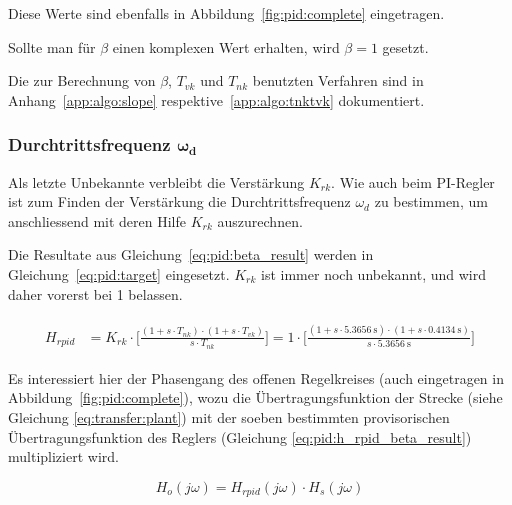 Diese Werte sind ebenfalls in Abbildung~\ref{fig:pid:complete} eingetragen.

Sollte  man  f\"ur  $\beta$  einen komplexen  Wert  erhalten,  wird  $\beta=1$
gesetzt.

Die zur Berechnung von $\beta$, $T_{vk}$ und $T_{nk}$ benutzten Verfahren sind
in Anhang~\ref{app:algo:slope} respektive~\ref{app:algo:tnktvk} dokumentiert.


\subsubsection{Durchtrittsfrequenz $\mathbf{\boldsymbol{\omega}_d}$}

Als  letzte Unbekannte  verbleibt  die Verst\"arkung  $K_{rk}$. Wie auch  beim
PI-Regler ist zum Finden  der Verst\"arkung die Durchtrittsfrequenz $\omega_d$
zu bestimmen, um anschliessend mit deren Hilfe $K_{rk}$ auszurechnen.

Die    Resultate    aus     Gleichung~\ref{eq:pid:beta_result}    werden    in
Gleichung~\ref{eq:pid:target} eingesetzt. $K_{rk}$  ist immer  noch unbekannt,
und wird daher vorerst bei 1 belassen.

\begin{gather} \label{eq:pid:h_rpid_beta_result}
    \begin{split}
        H_{rpid} & = K_{rk} \cdot \biggl[ \frac{(1 + s \cdot T_{nk}               ) \cdot (1 + s \cdot T_{vk}               ) }{ s \cdot T_{nk}               } \biggr]
                   = 1      \cdot \biggl[ \frac{(1 + s \cdot \SI{5.3656}{\second} ) \cdot (1 + s \cdot \SI{0.4134}{\second} ) }{ s \cdot \SI{5.3656}{\second} } \biggr]
    \end{split}
\end{gather}


Es interessiert hier der Phasengang des offenen Regelkreises (auch eingetragen
in   Abbildung~\ref{fig:pid:complete}),    wozu   die   \"Ubertragungsfunktion
der  Strecke   (siehe  Gleichung   \ref{eq:transfer:plant})  mit   der  soeben
bestimmten  provisorischen   \"Ubertragungsfunktion  des   Reglers  (Gleichung
\ref{eq:pid:h_rpid_beta_result}) multipliziert wird.

\begin{equation} \label{eq:pid:h_o_k_rk_one}
    H_{o}(j\omega) = H_{rpid}(j\omega) \cdot H_s(j\omega)
\end{equation}

